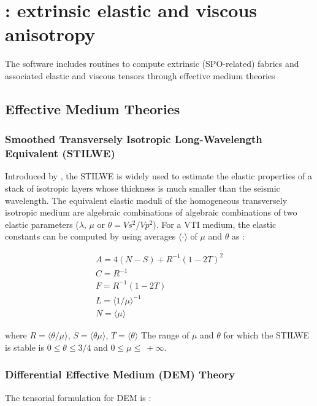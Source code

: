 \chapter{\exevtitle: extrinsic elastic and viscous anisotropy}

\label{chapter:exev}

The \exevtitle{} software includes routines to compute extrinsic (SPO-related) fabrics and associated elastic and viscous tensors through effective medium theories\\

\section{Effective Medium Theories}

\subsection{Smoothed Transversely Isotropic Long-Wavelength Equivalent (STILWE)}
Introduced by \citep{backus1962jgr}, the STILWE is widely used to estimate the elastic properties of a stack of isotropic layers whose thickness is much smaller than the seismic wavelength. The equivalent elastic moduli of the homogeneous transversely isotropic medium are algebraic combinations of algebraic combinations of two elastic parameters ($\lambda$, $\mu$ or $\theta=Vs^2/Vp^2$). For a VTI medium, the elastic constants can be computed by using averages $\langle \cdot \rangle$ of $\mu$ and $\theta$ as \citep{backus1962jgr}:

\begin{gather}
    A=4(N-S)+R^{-1} (1-2T)^2\\
    C=R^{-1}\\
    F=R^{-1} (1-2T)\\
    L=\langle1/\mu \rangle^{-1}\\
    N=\langle\mu\rangle
\end{gather}

where $R=\langle \theta/\mu \rangle$, $S=\langle \theta\mu \rangle$, $T=\langle \theta \rangle$
The range of $\mu$ and $\theta$ for which the STILWE is stable is $0\leq\theta\leq3/4$ and $0\leq\mu\leq\ +\infty$.\\




\subsection{Differential Effective Medium (DEM) Theory}
The tensorial formulation for DEM is \citep{mclaughlin1977}:

